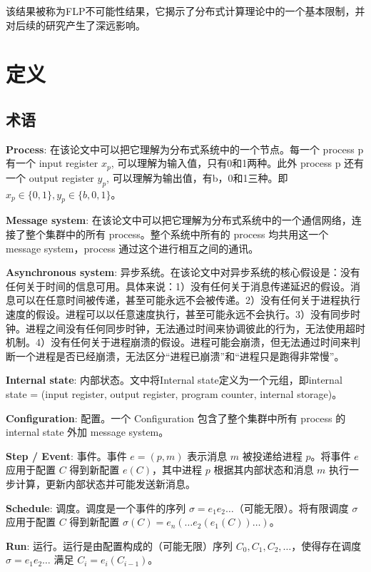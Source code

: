\documentclass[12pt, a4paper]{ctexart}
\theoremstyle{definition}
\theoremstyle{plain}
\theoremstyle{remark}
\begin{document}
    该结果被称为FLP不可能性结果，它揭示了分布式计算理论中的一个基本限制，并对后续的研究产生了深远影响。

\section{定义}

\subsection{术语}

    \textbf{Process}: 在该论文中可以把它理解为分布式系统中的一个节点。每一个 process p 有一个 input register $x_{p}$, 可以理解为输入值，只有0和1两种。此外 process p 还有一个 output register $y_{p}$, 可以理解为输出值，有b，0和1三种。即$x_{p} \in \{0, 1\}, y_{p} \in \{b, 0, 1\}$。

    \textbf{Message system}: 在该论文中可以把它理解为分布式系统中的一个通信网络，连接了整个集群中的所有 process。整个系统中所有的 process 均共用这一个 message system，process 通过这个进行相互之间的通讯。

    \textbf{Asynchronous system}: 异步系统。在该论文中对异步系统的核心假设是：没有任何关于时间的信息可用。具体来说：1）没有任何关于消息传递延迟的假设。消息可以在任意时间被传递，甚至可能永远不会被传递。2）没有任何关于进程执行速度的假设。进程可以以任意速度执行，甚至可能永远不会执行。3）没有同步时钟。进程之间没有任何同步时钟，无法通过时间来协调彼此的行为，无法使用超时机制。4）没有任何关于进程崩溃的假设。进程可能会崩溃，但无法通过时间来判断一个进程是否已经崩溃，无法区分“进程已崩溃”和“进程只是跑得非常慢”。
        
    \textbf{Internal state}: 内部状态。文中将Internal state定义为一个元组，即internal state = (input register, output register, program counter, internal storage)。

    \textbf{Configuration}: 配置。一个 Configuration 包含了整个集群中所有 process 的 internal state 外加 message system。

    \textbf{Step / Event}: 事件。事件 \(e = (p, m)\) 表示消息 \(m\) 被投递给进程 \(p\)。将事件 \(e\) 应用于配置 \(C\) 得到新配置 \(e(C)\)，其中进程 \(p\) 根据其内部状态和消息 \(m\) 执行一步计算，更新内部状态并可能发送新消息。

    \textbf{Schedule}: 调度。调度是一个事件的序列 \(\sigma = e_1 e_2 \dots\)（可能无限）。将有限调度 \(\sigma\) 应用于配置 \(C\) 得到新配置 \(\sigma(C) = e_n(\dots e_2(e_1(C))\dots)\)。

    \textbf{Run}: 运行。运行是由配置构成的（可能无限）序列 \(C_0, C_1, C_2, \dots\)，使得存在调度 \(\sigma = e_1 e_2 \dots\) 满足 \(C_i = e_i(C_{i-1})\)。
\end{document}
